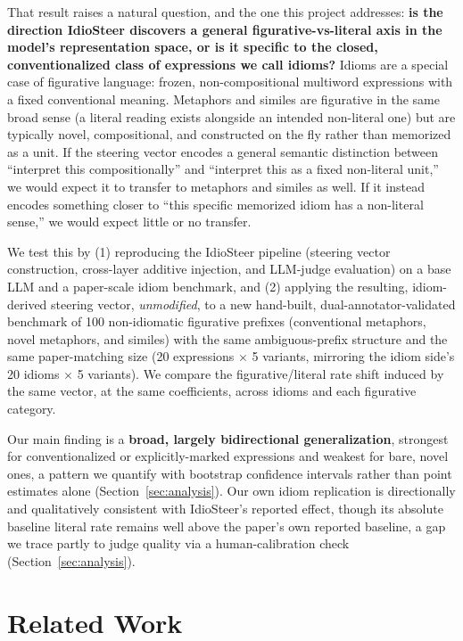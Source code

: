 \documentclass[11pt]{article}
\begin{document}
That result raises a natural question, and the one this project addresses: \textbf{is the
direction IdioSteer discovers a general figurative-vs-literal axis in the model's
representation space, or is it specific to the closed, conventionalized class of
expressions we call idioms?} Idioms are a special case of figurative language: frozen,
non-compositional multiword expressions with a fixed conventional meaning.
Metaphors and similes are figurative in the same broad sense (a literal reading exists
alongside an intended non-literal one) but are typically novel, compositional, and
constructed on the fly rather than memorized as a unit. If the steering vector encodes a
general semantic distinction between ``interpret this compositionally'' and ``interpret
this as a fixed non-literal unit,'' we would expect it to transfer to metaphors and
similes as well. If it instead encodes something closer to ``this specific memorized
idiom has a non-literal sense,'' we would expect little or no transfer.

We test this by (1) reproducing the IdioSteer pipeline (steering vector construction,
cross-layer additive injection, and LLM-judge evaluation) on a base LLM and a
paper-scale idiom benchmark, and (2) applying the resulting, idiom-derived steering
vector, \emph{unmodified}, to a new hand-built, dual-annotator-validated benchmark of 100
non-idiomatic figurative prefixes (conventional metaphors, novel metaphors, and similes)
with the same ambiguous-prefix structure and the same paper-matching size (20
expressions $\times$ 5 variants, mirroring the idiom side's 20 idioms $\times$ 5
variants). We compare the figurative/literal rate shift induced by the same vector, at
the same coefficients, across idioms and each figurative category.

Our main finding is a \textbf{broad, largely bidirectional generalization}, strongest for
conventionalized or explicitly-marked expressions and weakest for bare, novel ones, a
pattern we quantify with bootstrap confidence intervals rather than point estimates
alone (Section~\ref{sec:analysis}). Our own idiom replication is directionally and
qualitatively consistent with IdioSteer's reported effect, though its absolute baseline
literal rate remains well above the paper's own reported baseline, a gap we trace partly
to judge quality via a human-calibration check (Section~\ref{sec:analysis}).

\section{Related Work}
\end{document}
